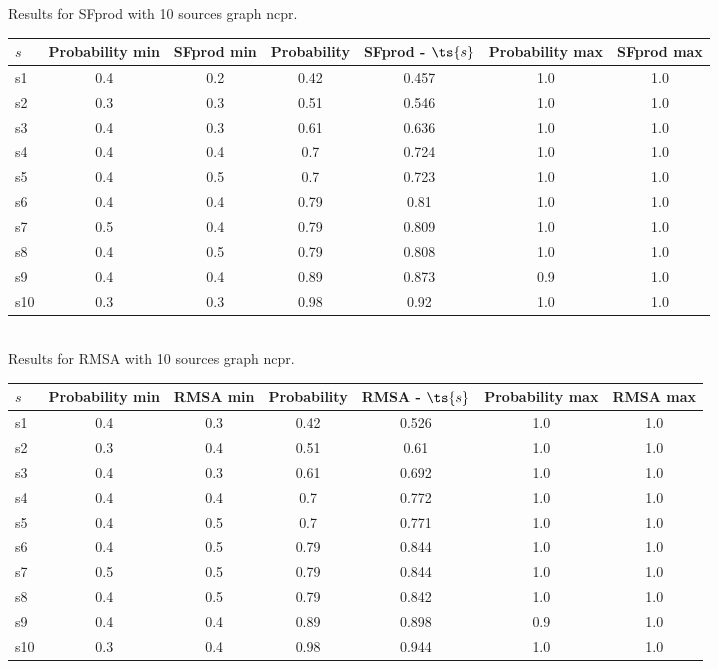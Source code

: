 \documentclass{article}
\begin{document}
\noindent Results for SFprod with 10 sources graph ncpr.

\noindent\begin{tabular}{|l|c|c|c|c|c|c|}
\hline
$s$& Probability min & SFprod min & Probability & SFprod - $\ts{s}$ & Probability max & SFprod max\\
\hline
s1 &0.4 & 0.2 & 0.42 & 0.457 & 1.0 & 1.0\\
\hline
s2 &0.3 & 0.3 & 0.51 & 0.546 & 1.0 & 1.0\\
\hline
s3 &0.4 & 0.3 & 0.61 & 0.636 & 1.0 & 1.0\\
\hline
s4 &0.4 & 0.4 & 0.7 & 0.724 & 1.0 & 1.0\\
\hline
s5 &0.4 & 0.5 & 0.7 & 0.723 & 1.0 & 1.0\\
\hline
s6 &0.4 & 0.4 & 0.79 & 0.81 & 1.0 & 1.0\\
\hline
s7 &0.5 & 0.4 & 0.79 & 0.809 & 1.0 & 1.0\\
\hline
s8 &0.4 & 0.5 & 0.79 & 0.808 & 1.0 & 1.0\\
\hline
s9 &0.4 & 0.4 & 0.89 & 0.873 & 0.9 & 1.0\\
\hline
s10 &0.3 & 0.3 & 0.98 & 0.92 & 1.0 & 1.0\\
\hline
\end{tabular}\\

\noindent Results for RMSA with 10 sources graph ncpr.

\noindent\begin{tabular}{|l|c|c|c|c|c|c|}
\hline
$s$& Probability min & RMSA min & Probability & RMSA - $\ts{s}$ & Probability max & RMSA max\\
\hline
s1 &0.4 & 0.3 & 0.42 & 0.526 & 1.0 & 1.0\\
\hline
s2 &0.3 & 0.4 & 0.51 & 0.61 & 1.0 & 1.0\\
\hline
s3 &0.4 & 0.3 & 0.61 & 0.692 & 1.0 & 1.0\\
\hline
s4 &0.4 & 0.4 & 0.7 & 0.772 & 1.0 & 1.0\\
\hline
s5 &0.4 & 0.5 & 0.7 & 0.771 & 1.0 & 1.0\\
\hline
s6 &0.4 & 0.5 & 0.79 & 0.844 & 1.0 & 1.0\\
\hline
s7 &0.5 & 0.5 & 0.79 & 0.844 & 1.0 & 1.0\\
\hline
s8 &0.4 & 0.5 & 0.79 & 0.842 & 1.0 & 1.0\\
\hline
s9 &0.4 & 0.4 & 0.89 & 0.898 & 0.9 & 1.0\\
\hline
s10 &0.3 & 0.4 & 0.98 & 0.944 & 1.0 & 1.0\\
\hline
\end{tabular}\\
\end{document}
